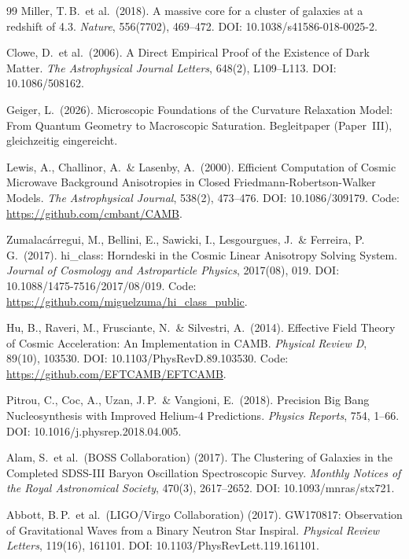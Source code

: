 \documentclass[aps,prd,twocolumn,superscriptaddress,nofootinbib]{revtex4-2}
\begin{document}
\begin{thebibliography}{99}
Miller, T.\,B.\ et al.\ (2018).
A massive core for a cluster of galaxies at a redshift of 4.3.
\textit{Nature}, 556(7702), 469--472.
DOI: 10.1038/s41586-018-0025-2.

Clowe, D.\ et al.\ (2006).
A Direct Empirical Proof of the Existence of Dark Matter.
\textit{The Astrophysical Journal Letters}, 648(2), L109--L113.
DOI: 10.1086/508162.

Geiger, L.\ (2026).
Microscopic Foundations of the Curvature Relaxation Model: From Quantum Geometry to Macroscopic Saturation.
Begleitpaper (Paper~III), gleichzeitig eingereicht.

Lewis, A., Challinor, A.\ \& Lasenby, A.\ (2000).
Efficient Computation of Cosmic Microwave Background Anisotropies in Closed Friedmann-Robertson-Walker Models.
\textit{The Astrophysical Journal}, 538(2), 473--476.
DOI: 10.1086/309179. Code: \url{https://github.com/cmbant/CAMB}.

Zumalac\'arregui, M., Bellini, E., Sawicki, I., Lesgourgues, J.\ \& Ferreira, P.\,G.\ (2017).
hi\_class: Horndeski in the Cosmic Linear Anisotropy Solving System.
\textit{Journal of Cosmology and Astroparticle Physics}, 2017(08), 019.
DOI: 10.1088/1475-7516/2017/08/019. Code: \url{https://github.com/miguelzuma/hi_class_public}.

Hu, B., Raveri, M., Frusciante, N.\ \& Silvestri, A.\ (2014).
Effective Field Theory of Cosmic Acceleration: An Implementation in CAMB.
\textit{Physical Review D}, 89(10), 103530.
DOI: 10.1103/PhysRevD.89.103530. Code: \url{https://github.com/EFTCAMB/EFTCAMB}.

Pitrou, C., Coc, A., Uzan, J.\,P.\ \& Vangioni, E.\ (2018).
Precision Big Bang Nucleosynthesis with Improved Helium-4 Predictions.
\textit{Physics Reports}, 754, 1--66.
DOI: 10.1016/j.physrep.2018.04.005.

Alam, S.\ et al.\ (BOSS Collaboration) (2017).
The Clustering of Galaxies in the Completed SDSS-III Baryon Oscillation Spectroscopic Survey.
\textit{Monthly Notices of the Royal Astronomical Society}, 470(3), 2617--2652.
DOI: 10.1093/mnras/stx721.

Abbott, B.\,P.\ et al.\ (LIGO/Virgo Collaboration) (2017).
GW170817: Observation of Gravitational Waves from a Binary Neutron Star Inspiral.
\textit{Physical Review Letters}, 119(16), 161101.
DOI: 10.1103/PhysRevLett.119.161101.


\end{thebibliography}
\end{document}
